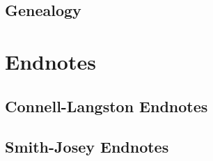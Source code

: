 \documentclass[11pt,letter]{book}
\begin{document}
\section{Genealogy}



\chapter{Endnotes}

\section{Connell-Langston Endnotes}

\footnotesize



\normalsize

\section{Smith-Josey Endnotes}

\footnotesize



\normalsize
\end{document}
